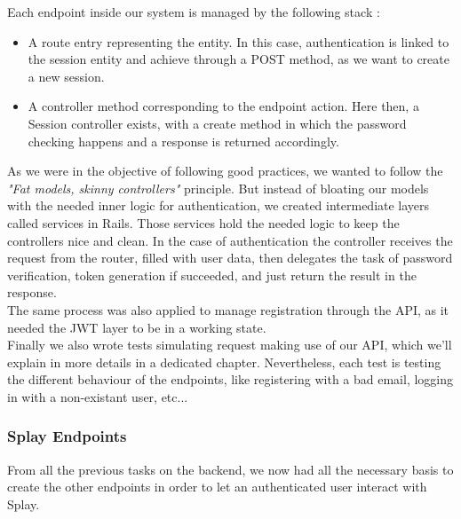 \documentclass{eplmastersthesis}
\begin{document}
          Each endpoint inside our system is managed by the following stack :

          \begin{itemize}
            \item A route entry representing the entity. In this case,
            authentication is linked to the session entity and achieve through
            a POST method, as we want to create a new session.
            \item A controller method corresponding to the endpoint action.
            Here then, a Session controller exists, with a create method in
            which the password checking happens and a response is returned
            accordingly.
          \end{itemize}

          As we were in the objective of following good practices, we wanted
          to follow the \textit{"Fat models, skinny controllers"} principle.
          But instead of bloating our models with the needed inner logic for
          authentication, we created intermediate layers called services
          in Rails. Those services hold the needed logic to keep the controllers
          nice and clean. In the case of authentication the controller receives
          the request from the router, filled with user data, then delegates
          the task of password verification, token generation if succeeded,
          and just return the result in the response.\\

          The same process was also applied to manage registration through
          the API, as it needed the JWT layer to be in a working state.\\

          Finally we also wrote tests simulating request making use of our
          API, which we'll explain in more details in a dedicated chapter.
          Nevertheless, each test is testing the different behaviour of
          the endpoints, like registering with a bad email, logging in with
          a non-existant user, etc...

        \subsubsection{Splay Endpoints}

          From all the previous tasks on the backend, we now had all the
          necessary basis to create the other endpoints in order to let
          an authenticated user interact with Splay.\\
\end{document}
